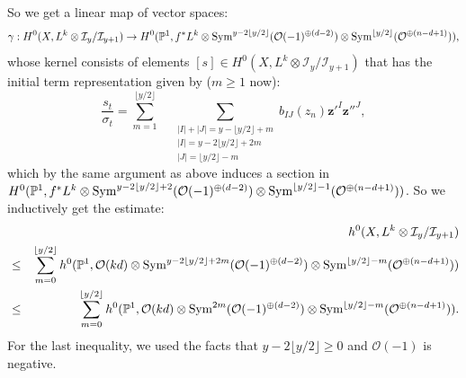 \documentclass[12pt]{amsart}
\theoremstyle{definition}
\def\sym{{\rm Sym}}
\def\bz{{\mathbf{z}}}
\newcommand{\IP}{{\mathbb P}}
\newcommand{\CI}{{\mathcal I}}
\newcommand{\CO}{{\mathcal O}}
\begin{document}
So we get a linear map of vector spaces:
\begin{equation*}
    \gamma: H^0(X, L^k\otimes \CI_y/\CI_{y+1})\rightarrow H^0(\IP^1, f^*L^k\otimes\sym^{y-2 \lfloor y/2 \rfloor}(\CO(-1)^{\oplus (d-2)})\otimes \sym^{\lfloor y/2\rfloor}(\CO^{\oplus (n-d+1)})),
\end{equation*}
whose kernel consists of elements $[s]\in H^0(X, L^k\otimes \CI_y/\CI_{y+1})$ that has the initial term representation given by ($m\ge 1$ now):
\begin{equation*}
    \frac{s_t}{\sigma_t}=\sum_{m=1}^{\lfloor y/2\rfloor}\quad  \sum_{\substack{|I|+|J|=y-\lfloor y/2 \rfloor+m \\ |I|=y-2 \lfloor y/2\rfloor+2 m\\ |J|=\lfloor y/2\rfloor-m}} b_{IJ}(z_n) \bz'^I \bz''^J,
\end{equation*}
which by the same argument as above induces a section in $H^0(\IP^1, f^*L^k\otimes \sym^{y-2\lfloor y/2\rfloor +2}(\CO(-1)^{\oplus(d-2)})\otimes \sym^{\lfloor y/2 \rfloor-1}(\CO^{\oplus (n-d+1)}))$. 
So we inductively get the estimate:
\begin{eqnarray}
    && h^0(X, L^k\otimes \CI_y/\CI_{y+1})\\
    &\le& 
    \sum_{m=0}^{\lfloor y/2\rfloor }h^0(\IP^1, \CO(kd)\otimes \sym^{y-2 \lfloor y/2\rfloor+2m}(\CO(-1)^{\oplus (d-2)})\otimes \sym^{\lfloor y/2\rfloor -m}(\CO^{\oplus (n-d+1)}))\nonumber \\
    &\le & \sum_{m=0}^{\lfloor y/2\rfloor}h^0(\IP^1, \CO(kd)\otimes \sym^{2 m}(\CO(-1)^{\oplus (d-2)})\otimes \sym^{\lfloor y/2\rfloor-m}(\CO^{\oplus (n-d+1)})). \label{eq-west}
\end{eqnarray}
For the last inequality, we used the facts that $y-2 \lfloor y/2\rfloor\ge 0$ and $\CO(-1)$ is negative. 
\end{document}
